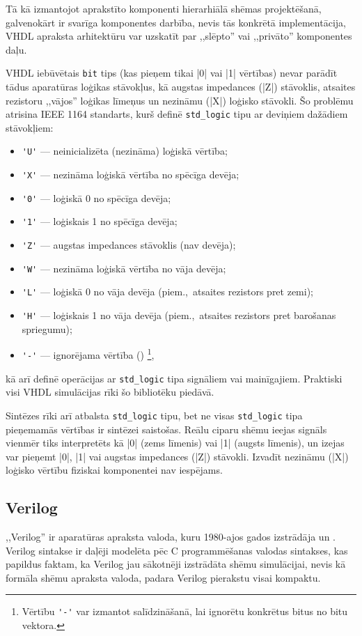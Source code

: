 	Tā kā izmantojot aprakstīto komponenti hierarhiālā shēmas projektēšanā, 
	galvenokārt ir svarīga komponentes darbība, nevis tās konkrētā implementācija,
	VHDL apraksta arhitektūru var uzskatīt par ,,slēpto'' vai ,,privāto''
	komponentes daļu.

	VHDL iebūvētais \texttt{bit} tips (kas pieņem tikai |0| vai |1| vērtības)
	nevar parādīt tādus aparatūras loģikas stāvokļus, kā augstas impedances
	(|Z|) stāvoklis, atsaites rezistoru ,,vājos'' loģikas līmeņus un nezināmu
	(|X|) loģisko stāvokli. Šo problēmu atrisina IEEE 1164 standarts, kurš definē
	\texttt{std\_logic} tipu ar deviņiem dažādiem stāvokļiem:
	\begin{itemize}
		\item \verb|'U'| --- neinicializēta (nezināma) loģiskā vērtība;
		\item \verb|'X'| --- nezināma loģiskā vērtība no spēcīga devēja;
		\item \verb|'0'| --- loģiskā 0 no spēcīga devēja;
		\item \verb|'1'| --- loģiskais 1 no spēcīga devēja;
		\item \verb|'Z'| --- augstas impedances stāvoklis (nav devēja);
		\item \verb|'W'| --- nezināma loģiskā vērtība no vāja devēja;
		\item \verb|'L'| --- loģiskā 0 no vāja devēja (piem.,~atsaites rezistors pret zemi);
		\item \verb|'H'| --- loģiskais 1 no vāja devēja (piem.,~atsaites rezistors pret barošanas spriegumu);
		\item \verb|'-'| --- ignorējama vērtība ()%
			\footnote{Vērtību \verb|'-'| var izmantot salīdzināšanā,
				lai ignorētu konkrētus bitus no bitu vektora.},
	\end{itemize}
	kā arī definē operācijas ar \texttt{std\_logic} tipa signāliem vai mainīgajiem. 
	Praktiski visi VHDL simulācijas rīki šo bibliotēku piedāvā.
	
	Sintēzes rīki arī atbalsta \texttt{std\_logic} tipu, bet ne visas
	\texttt{std\_logic} tipa pieņemamās vērtības ir sintēzei saistošas.
	Reālu ciparu shēmu ieejas signāls vienmēr tiks interpretēts kā |0| (zems līmenis) 
	vai |1| (augsts līmenis), un izejas var pieņemt |0|, |1| vai augstas
	impedances (|Z|) stāvokli. Izvadīt nezināmu (|X|) loģisko vērtību
	fiziskai komponentei nav iespējams.	%

\pagebreak[3]
\subsection{Verilog} \label{sec:verilog}
	,,Verilog'' ir aparatūras apraksta valoda, kuru 1980-ajos gados izstrādāja
	 un . Verilog sintakse ir daļēji modelēta
	pēc C programmēšanas valodas sintakses, kas papildus faktam, ka Verilog
	jau sākotnēji izstrādāta shēmu simulācijai, nevis
	kā formāla shēmu apraksta valoda, padara Verilog pierakstu visai kompaktu.

